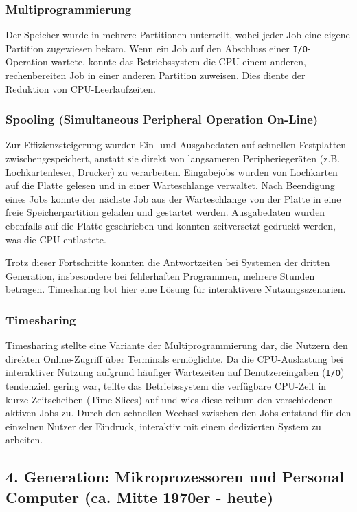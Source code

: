 \subsubsection*{Multiprogrammierung}
Der Speicher wurde in mehrere Partitionen unterteilt, wobei jeder Job eine eigene Partition zugewiesen bekam. Wenn ein Job auf den Abschluss einer \texttt{I/O}-Operation wartete, konnte das Betriebssystem die CPU einem anderen, rechenbereiten Job in einer anderen Partition zuweisen. Dies diente der Reduktion von CPU-Leerlaufzeiten.

\subsubsection*{Spooling (Simultaneous Peripheral Operation On-Line)}
Zur Effizienzsteigerung wurden Ein- und Ausgabedaten auf schnellen Festplatten zwischengespeichert, anstatt sie direkt von langsameren Peripheriegeräten (z.B. Lochkartenleser, Drucker) zu verarbeiten. Eingabejobs wurden von Lochkarten auf die Platte gelesen und in einer Warteschlange verwaltet. Nach Beendigung eines Jobs konnte der nächste Job aus der Warteschlange von der Platte in eine freie Speicherpartition geladen und gestartet werden. Ausgabedaten wurden ebenfalls auf die Platte geschrieben und konnten zeitversetzt gedruckt werden, was die CPU entlastete.

Trotz dieser Fortschritte konnten die Antwortzeiten bei Systemen der dritten Generation, insbesondere bei fehlerhaften Programmen, mehrere Stunden betragen. Timesharing bot hier eine Lösung für interaktivere Nutzungsszenarien.

\subsubsection*{Timesharing}
Timesharing stellte eine Variante der Multiprogrammierung dar, die Nutzern den direkten Online-Zugriff über Terminals ermöglichte. Da die CPU-Auslastung bei interaktiver Nutzung aufgrund häufiger Wartezeiten auf Benutzereingaben (\texttt{I/O}) tendenziell gering war, teilte das Betriebssystem die verfügbare CPU-Zeit in kurze Zeitscheiben (Time Slices) auf und wies diese reihum den verschiedenen aktiven Jobs zu. Durch den schnellen Wechsel zwischen den Jobs entstand für den einzelnen Nutzer der Eindruck, interaktiv mit einem dedizierten System zu arbeiten.

\subsection{4. Generation: Mikroprozessoren und Personal Computer (ca. Mitte 1970er - heute)}

